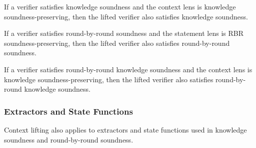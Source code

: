 \begin{theorem}
    \label{thm:lift_context_knowledge_soundness}
    If a verifier satisfies knowledge soundness and the context lens is knowledge soundness-preserving, then the lifted verifier also satisfies knowledge soundness.
\end{theorem}

\begin{theorem}
    \label{thm:lift_context_rbr_soundness}
    If a verifier satisfies round-by-round soundness and the statement lens is RBR soundness-preserving, then the lifted verifier also satisfies round-by-round soundness.
\end{theorem}

\begin{theorem}
    \label{thm:lift_context_rbr_knowledge_soundness}
    If a verifier satisfies round-by-round knowledge soundness and the context lens is knowledge soundness-preserving, then the lifted verifier also satisfies round-by-round knowledge soundness.
\end{theorem}

\subsubsection{Extractors and State Functions}

Context lifting also applies to extractors and state functions used in knowledge soundness and round-by-round soundness.

\begin{definition}
    \label{def:straightline_extractor_lift_context}
\end{definition}

\begin{definition}
    \label{def:rbr_extractor_lift_context}
\end{definition}

